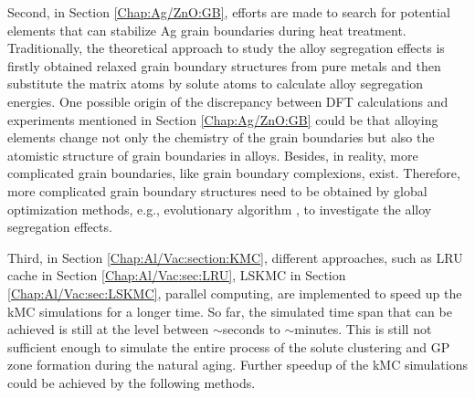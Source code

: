 Second, in Section \ref{Chap:Ag/ZnO:GB}, efforts are made to search for potential elements that can stabilize Ag grain boundaries during heat treatment. Traditionally, the theoretical approach to study the alloy segregation effects is firstly obtained relaxed grain boundary structures from pure metals and then substitute the matrix atoms by solute atoms to calculate alloy segregation energies. One possible origin of the discrepancy between DFT calculations and experiments mentioned in Section \ref{Chap:Ag/ZnO:GB} could be that alloying elements change not only the chemistry of the grain boundaries but also the atomistic structure of grain boundaries in alloys. Besides, in reality, more complicated grain boundaries, like grain boundary complexions, exist\cite{cantwell2014grain}. Therefore, more complicated grain boundary structures need to be obtained by global optimization methods, e.g., evolutionary algorithm \cite{yang2020grain}, to investigate the alloy segregation effects.

Third, in Section \ref{Chap:Al/Vac:section:KMC}, different approaches, such as \ac{LRU} cache in Section \ref{Chap:Al/Vac:sec:LRU}, \ac{LSKMC} in Section \ref{Chap:Al/Vac:sec:LSKMC}, parallel computing, are implemented to speed up the \ac{kMC} simulations for a longer time. So far, the simulated time span that can be achieved is still at the level between $\sim$seconds to $\sim$minutes. This is still not sufficient enough to simulate the entire process of the solute clustering and \ac{GP} zone formation during the natural aging. Further speedup of the \ac{kMC} simulations could be achieved by the following methods.

